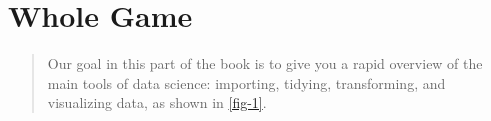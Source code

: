 \documentclass[openany]{book}
\begin{document}
\part{Whole Game}
\begin{quote}
    Our goal in this part of the book is to give you a rapid overview of the main tools of data science: importing, tidying, transforming, and visualizing data, as shown in \autoref{fig-1}.

\end{quote}

\end{document}
